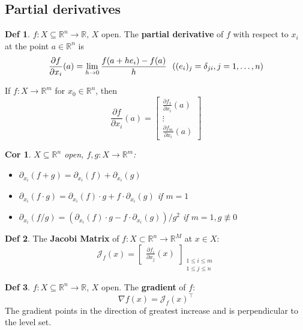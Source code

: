 \documentclass[a4paper, 10pt]{article}
\newtheorem*{corollary}{Cor}
\theoremstyle{definition}
\newtheorem*{definition}{Def}
\newcommand{\R}{\mathbb{R}}
\newcommand{\J}{\mathcal{J}}
\begin{document}
\subsection{Partial derivatives}
\begin{definition}
    \(f: X \subseteq \R^n \to \R\), \(X\) open. The \textbf{partial derivative} of \(f\) with respect to \(x_i\) at the point \(a \in \R^n\) is
    \[\frac{\partial f}{\partial x_i}(a) = \lim_{h \to 0} \frac{f(a + h e_i) - f(a)}{h} \hfill \ \ ((e_i)_j = \delta_{ji}, j = 1, \ldots, n)\]

    If \(f: X \to \R^m\) for \(x_0 \in \R^n\), then
    \[\frac{\partial f}{\partial x_i}(a) = \begin{bmatrix}
        \frac{\partial f_1}{\partial x_i}(a) \\
        \vdots \\
        \frac{\partial f_m}{\partial x_i}(a)
    \end{bmatrix}\]
\end{definition}

\begin{corollary}
    \(X \subseteq \R^n\) open, \(f, g: X \to \R^m\):
    \begin{itemize}
        \item \(\partial_{x_i}(f + g) = \partial_{x_i}(f) + \partial_{x_i}(g)\)
        \item \(\partial_{x_i}(f \cdot g) = \partial_{x_i}(f) \cdot g + f \cdot \partial_{x_i}(g)\) if \(m = 1\)
        \item \(\partial_{x_i}(f / g) = (\partial_{x_i}(f) \cdot g - f \cdot \partial_{x_i}(g)) / g^2\) if \(m = 1, g \not\equiv 0\)
    \end{itemize}
\end{corollary}

\begin{definition}
    The \textbf{Jacobi Matrix} of \(f: X \subset \R^n \to \R^M\) at \(x \in X\):
    \[\J_f(x) = \begin{bmatrix}
        \frac{\partial f_i}{\partial x_j}(x)
    \end{bmatrix}_{\substack{1 \leq i \leq m \\ 1 \leq j \leq n}}\]
\end{definition}

\begin{definition}
    \(f: X \subseteq \R^n \to \R\), \(X\) open. The \textbf{gradient} of \(f\):
    \[\nabla f(x) = \J_f(x)^\top\]
    The gradient points in the direction of greatest increase and is perpendicular to the level set.
\end{definition}
\end{document}
